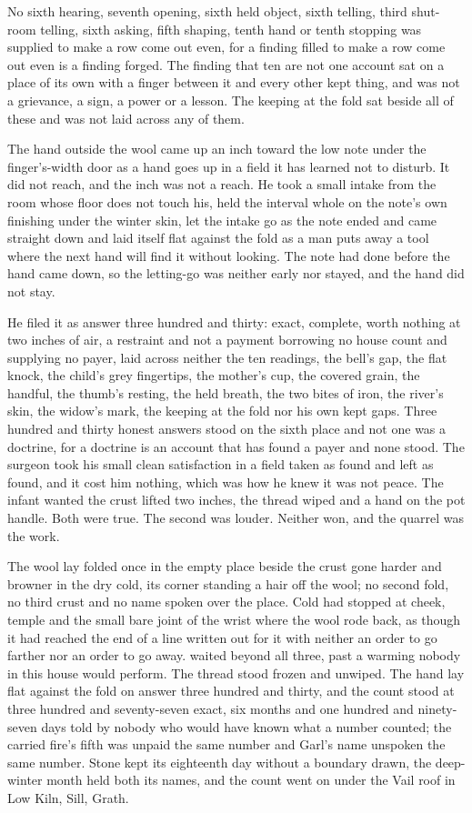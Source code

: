 No sixth hearing, seventh opening, sixth held object, sixth telling, third shut-room telling, sixth asking, fifth shaping, tenth hand or tenth stopping was supplied to make a row come out even, for a finding filled to make a row come out even is a finding forged. The finding that ten are not one account sat on a place of its own with a finger between it and every other kept thing, and was not a grievance, a sign, a power or a lesson. The keeping at the fold sat beside all of these and was not laid across any of them.

The hand outside the wool came up an inch toward the low note under the finger's-width door as a hand goes up in a field it has learned not to disturb. It did not reach, and the inch was not a reach. He took a small intake from the room whose floor does not touch his, held the interval whole on the note's own finishing under the winter skin, let the intake go as the note ended and came straight down and laid itself flat against the fold as a man puts away a tool where the next hand will find it without looking. The note had done before the hand came down, so the letting-go was neither early nor stayed, and the hand did not stay.

He filed it as answer three hundred and thirty: exact, complete, worth nothing at two inches of air, a restraint and not a payment borrowing no house count and supplying no payer, laid across neither the ten readings, the bell's gap, the flat knock, the child's grey fingertips, the mother's cup, the covered grain, the handful, the thumb's resting, the held breath, the two bites of iron, the river's skin, the widow's mark, the keeping at the fold nor his own kept gaps. Three hundred and thirty honest answers stood on the sixth place and not one was a doctrine, for a doctrine is an account that has found a payer and none stood. The surgeon took his small clean satisfaction in a field taken as found and left as found, and it cost him nothing, which was how he knew it was not peace. The infant wanted the crust lifted two inches, the thread wiped and a hand on the pot handle. Both were true. The second was louder. Neither won, and the quarrel was the work.

The wool lay folded once in the empty place beside the crust gone harder and browner in the dry cold, its corner standing a hair off the wool; no second fold, no third crust and no name spoken over the place. Cold had stopped at cheek, temple and the small bare joint of the wrist where the wool rode back, as though it had reached the end of a line written out for it with neither an order to go farther nor an order to go away.  waited beyond all three, past a warming nobody in this house would perform. The thread stood frozen and unwiped. The hand lay flat against the fold on answer three hundred and thirty, and the count stood at three hundred and seventy-seven exact, six months and one hundred and ninety-seven days told by nobody who would have known what a number counted; the carried fire's fifth was unpaid the same number and Garl's name unspoken the same number. Stone kept its eighteenth day without a boundary drawn, the deep-winter month held both its names, and the count went on under the Vail roof in Low Kiln, Sill, Grath.
